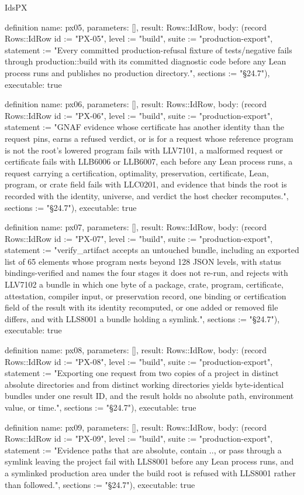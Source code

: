 \begin{lexlean}{IdsPX}
\begin{semanticmodule}
definition{
  name: px05,
  parameters: [],
  result: Rows::IdRow,
  body: (record Rows::IdRow {id := "PX-05", level := "build", suite := "production-export", statement := "Every committed production-refusal fixture of tests/negative fails through production::build with its committed diagnostic code before any Lean process runs and publishes no production directory.", sections := "§24.7"}),
  executable: true
}

definition{
  name: px06,
  parameters: [],
  result: Rows::IdRow,
  body: (record Rows::IdRow {id := "PX-06", level := "build", suite := "production-export", statement := "GNAF evidence whose certificate has another identity than the request pins, earns a refused verdict, or is for a request whose reference program is not the root's lowered program fails with LLV7101, a malformed request or certificate fails with LLB6006 or LLB6007, each before any Lean process runs, a request carrying a certification, optimality, preservation, certificate, Lean, program, or crate field fails with LLC0201, and evidence that binds the root is recorded with the identity, universe, and verdict the host checker recomputes.", sections := "§24.7"}),
  executable: true
}

definition{
  name: px07,
  parameters: [],
  result: Rows::IdRow,
  body: (record Rows::IdRow {id := "PX-07", level := "build", suite := "production-export", statement := "verify_artifact accepts an untouched bundle, including an exported list of 65 elements whose program nests beyond 128 JSON levels, with status bindings-verified and names the four stages it does not re-run, and rejects with LLV7102 a bundle in which one byte of a package, crate, program, certificate, attestation, compiler input, or preservation record, one binding or certification field of the result with its identity recomputed, or one added or removed file differs, and with LLS8001 a bundle holding a symlink.", sections := "§24.7"}),
  executable: true
}

definition{
  name: px08,
  parameters: [],
  result: Rows::IdRow,
  body: (record Rows::IdRow {id := "PX-08", level := "build", suite := "production-export", statement := "Exporting one request from two copies of a project in distinct absolute directories and from distinct working directories yields byte-identical bundles under one result ID, and the result holds no absolute path, environment value, or time.", sections := "§24.7"}),
  executable: true
}

definition{
  name: px09,
  parameters: [],
  result: Rows::IdRow,
  body: (record Rows::IdRow {id := "PX-09", level := "build", suite := "production-export", statement := "Evidence paths that are absolute, contain .., or pass through a symlink leaving the project fail with LLS8001 before any Lean process runs, and a symlinked production area under the build root is refused with LLS8001 rather than followed.", sections := "§24.7"}),
  executable: true
}


\end{semanticmodule}
\end{lexlean}
